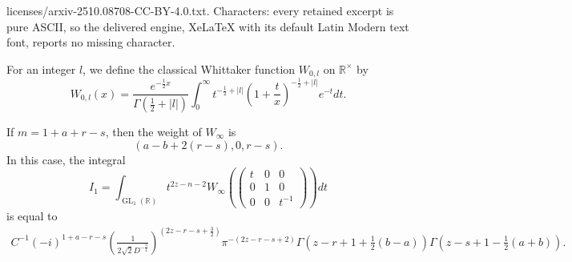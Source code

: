 \documentclass[10pt,a4paper]{amsart}
\DeclareMathOperator{\GL}{\mathrm{GL}}
\def\RR{\mathbb{R}}
\begin{document}
licenses/arxiv-2510.08708-CC-BY-4.0.txt. Characters: every retained excerpt is pure ASCII, so the delivered engine, XeLaTeX with its default Latin Modern text font, reports no missing character.
\begin{definition}
\label{Def: classical Whittaker function}
    For an integer $l$, we define the classical Whittaker function $W_{0, l}$ on $\RR^{\times}$ by 
             \begin{equation}
             \label{def:Whittaker_function}
                 W_{0, l}(x) = \frac{e^{-\frac{1}{2}x}}{\Gamma(\frac{1}{2} + |l|)} \int_{0}^{\infty} t^{-\frac{1}{2} + |l|}(1 + \frac{t}{x})^{-\frac{1}{2} + |l|} e^{-t} dt. 
             \end{equation}
\end{definition}

\begin{lemma}
\label{Lemma: integral I1}
If $m = 1+ a + r - s$, then the weight of $W_{\infty}$ is 
\begin{equation*}
(a - b + 2(r - s), 0, r-s).
\end{equation*}
In this case, the integral 
\begin{equation*}
    I_1 = \int_{\GL_1(\RR)} t^{2z - n - 2} W_{\infty}( \begin{pmatrix}
                                                                        t & 0 & 0 \\
                                                                        0 & 1 & 0 \\
                                                                        0 & 0 & t^{-1} 
                                                                      \end{pmatrix}) dt
\end{equation*}
is equal to 
\begin{align*}
    C^{-1} (-i)^{1 + a - r - s} (\frac{1}{2\sqrt{2}D^{-\frac{3}{4}}})^{(2z -r - s + \frac{3}{2})}\pi^{-(2z - r - s + 2)}\Gamma(z - r + 1 + \frac{1}{2}(b - a)) \Gamma(z - s + 1 - \frac{1}{2} (a + b)). 
\end{align*}
    
\end{lemma}
\end{document}
